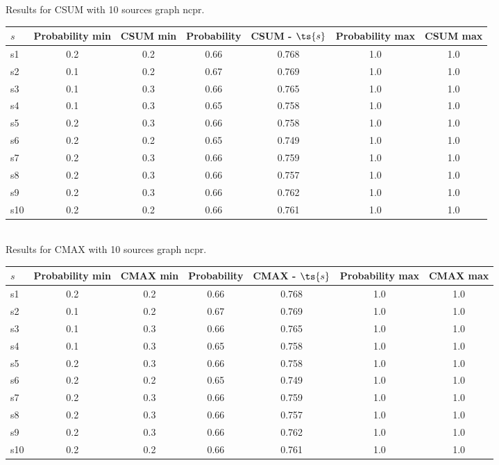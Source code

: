 \documentclass{article}
\begin{document}
\noindent Results for CSUM with 10 sources graph ncpr.

\noindent\begin{tabular}{|l|c|c|c|c|c|c|}
\hline
$s$& Probability min & CSUM min & Probability & CSUM - $\ts{s}$ & Probability max & CSUM max\\
\hline
s1 &0.2 & 0.2 & 0.66 & 0.768 & 1.0 & 1.0\\
\hline
s2 &0.1 & 0.2 & 0.67 & 0.769 & 1.0 & 1.0\\
\hline
s3 &0.1 & 0.3 & 0.66 & 0.765 & 1.0 & 1.0\\
\hline
s4 &0.1 & 0.3 & 0.65 & 0.758 & 1.0 & 1.0\\
\hline
s5 &0.2 & 0.3 & 0.66 & 0.758 & 1.0 & 1.0\\
\hline
s6 &0.2 & 0.2 & 0.65 & 0.749 & 1.0 & 1.0\\
\hline
s7 &0.2 & 0.3 & 0.66 & 0.759 & 1.0 & 1.0\\
\hline
s8 &0.2 & 0.3 & 0.66 & 0.757 & 1.0 & 1.0\\
\hline
s9 &0.2 & 0.3 & 0.66 & 0.762 & 1.0 & 1.0\\
\hline
s10 &0.2 & 0.2 & 0.66 & 0.761 & 1.0 & 1.0\\
\hline
\end{tabular}\\

\noindent Results for CMAX with 10 sources graph ncpr.

\noindent\begin{tabular}{|l|c|c|c|c|c|c|}
\hline
$s$& Probability min & CMAX min & Probability & CMAX - $\ts{s}$ & Probability max & CMAX max\\
\hline
s1 &0.2 & 0.2 & 0.66 & 0.768 & 1.0 & 1.0\\
\hline
s2 &0.1 & 0.2 & 0.67 & 0.769 & 1.0 & 1.0\\
\hline
s3 &0.1 & 0.3 & 0.66 & 0.765 & 1.0 & 1.0\\
\hline
s4 &0.1 & 0.3 & 0.65 & 0.758 & 1.0 & 1.0\\
\hline
s5 &0.2 & 0.3 & 0.66 & 0.758 & 1.0 & 1.0\\
\hline
s6 &0.2 & 0.2 & 0.65 & 0.749 & 1.0 & 1.0\\
\hline
s7 &0.2 & 0.3 & 0.66 & 0.759 & 1.0 & 1.0\\
\hline
s8 &0.2 & 0.3 & 0.66 & 0.757 & 1.0 & 1.0\\
\hline
s9 &0.2 & 0.3 & 0.66 & 0.762 & 1.0 & 1.0\\
\hline
s10 &0.2 & 0.2 & 0.66 & 0.761 & 1.0 & 1.0\\
\hline
\end{tabular}\\
\end{document}
